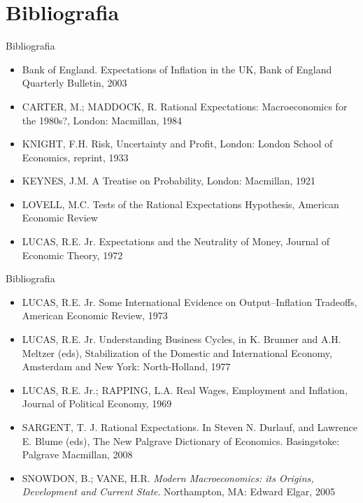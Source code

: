\documentclass[10pt]{beamer}
\begin{document}
\section{Bibliografia}
\begin{frame}{ Bibliografia}
    \begin{itemize}           
        \item Bank of England. Expectations of Inflation in the UK, Bank of England Quarterly Bulletin, 2003\medskip
        \item CARTER, M.; MADDOCK, R. Rational Expectations: Macroeconomics for the 1980s?, London: Macmillan, 1984\medskip
        \item KNIGHT, F.H. Risk, Uncertainty and Profit, London: London School of Economics, reprint, 1933\medskip
        \item KEYNES, J.M. A Treatise on Probability, London: Macmillan, 1921\medskip
        \item LOVELL, M.C. Tests of the Rational Expectations Hypothesis, American Economic Review\medskip
        \item LUCAS, R.E. Jr. Expectations and the Neutrality of Money, Journal of Economic Theory, 1972\medskip        
    \end{itemize}
\end{frame}

\begin{frame}{ Bibliografia}
    \begin{itemize}                        
        \item LUCAS, R.E. Jr. Some International Evidence on Output–Inflation Tradeoffs, American Economic Review, 1973\medskip
        \item LUCAS, R.E. Jr. Understanding Business Cycles, in K. Brunner and A.H. Meltzer (eds), Stabilization of the Domestic and International Economy, Amsterdam and New York: North-Holland, 1977\medskip
        \item LUCAS, R.E. Jr.; RAPPING, L.A. Real Wages, Employment and Inflation, Journal of Political Economy, 1969\medskip        
        \item SARGENT, T. J. Rational Expectations. In Steven N. Durlauf, and Lawrence E. Blume (eds), The New Palgrave Dictionary of Economics. Basingstoke: Palgrave Macmillan, 2008\medskip
        \item SNOWDON, B.; VANE, H.R. \emph{Modern Macroeconomics: its Origins, Development and Current State}. Northampton, MA: Edward Elgar, 2005\medskip        
    \end{itemize}
\end{frame}
\end{document}
